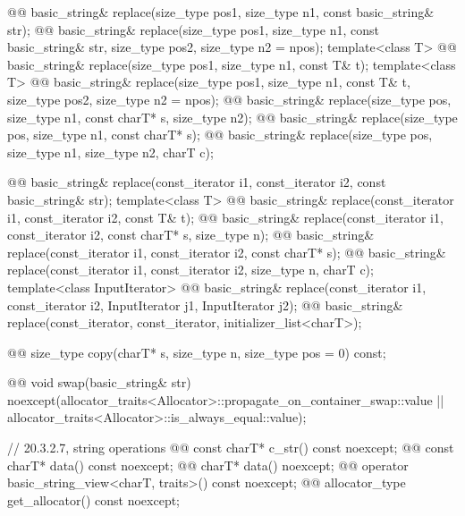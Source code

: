 \documentclass{wg21}
\begin{document}
\begin{codeblock}
{{    @@ basic_string& replace(size_type pos1, size_type n1, const basic_string& str);
    @@ basic_string& replace(size_type pos1, size_type n1, const basic_string& str,
                                              size_type pos2, size_type n2 = npos);
    template<class T>
      @@ basic_string& replace(size_type pos1, size_type n1, const T& t);
    template<class T>
      @@ basic_string& replace(size_type pos1, size_type n1, const T& t,
                                                size_type pos2, size_type n2 = npos);
    @@ basic_string& replace(size_type pos, size_type n1, const charT* s, size_type n2);
    @@ basic_string& replace(size_type pos, size_type n1, const charT* s);
    @@ basic_string& replace(size_type pos, size_type n1, size_type n2, charT c);

    @@
    basic_string& replace(const_iterator i1, const_iterator i2, const basic_string& str);
    template<class T>
      @@
      basic_string& replace(const_iterator i1, const_iterator i2, const T& t);
    @@
    basic_string& replace(const_iterator i1, const_iterator i2, const charT* s, size_type n);
    @@
    basic_string& replace(const_iterator i1, const_iterator i2, const charT* s);
    @@
    basic_string& replace(const_iterator i1, const_iterator i2, size_type n, charT c);
    template<class InputIterator>
      @@ basic_string& replace(const_iterator i1, const_iterator i2,
                                                InputIterator j1, InputIterator j2);
    @@ basic_string& replace(const_iterator, const_iterator, initializer_list<charT>);

    @@ size_type copy(charT* s, size_type n, size_type pos = 0) const;

    @@ void swap(basic_string& str)
      noexcept(allocator_traits<Allocator>::propagate_on_container_swap::value ||
               allocator_traits<Allocator>::is_always_equal::value);

    // 20.3.2.7, string operations
    @@ const charT* c_str() const noexcept;
    @@ const charT* data() const noexcept;
    @@ charT* data() noexcept;
    @@ operator basic_string_view<charT, traits>() const noexcept;
    @@ allocator_type get_allocator() const noexcept;

}}
\end{codeblock}
\end{document}
